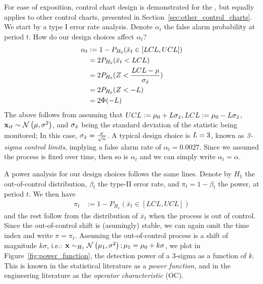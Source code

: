 For ease of exposition, control chart design is demonstrated for the \barxChart, but equally applies to other control charts, presented in Section~\ref{sec:other_control_charts}.
We start by a type I error rate analysis. 
Denote $\alpha_t$ the false alarm probability at period $t$.
How do our design choices affect $\alpha_t$?
\begin{align}
	\alpha_t &:= 1-P_{H_0}(\bar{x}_t \in [LCL,UCL]) \\
	&= 2 P_{H_0}(\bar{x}_t < LCL) \\
	&= 2 P_{H_0}(Z<\frac{LCL-\mu}{\sigma_{\bar{x}}}) \\
	&= 2 P_{H_0}(Z < -L) \\
	&= 2 \Phi(-L)
\end{align}
The above follows from assuming that $UCL:=\mu_0 + L \sigma_{\bar{x}}, LCL:= \mu_0 - L \sigma_{\bar{x}}$, $\mathbf{x}_{it}\sim \mathcal{N}\left(\mu,\sigma^2\right)$, and $\sigma_{\bar{x}}$ being the standard deviation of the statistic being monitored; In this case, $\sigma_{\bar{x}}=\frac{\sigma}{\sqrt{n}}$.
A typical design choice is $L=3$, known as \emph{3-sigma control limits}, implying a false alarm rate of $\alpha_t=0.0027$.
Since we assumed the process is fixed over time, then so is $\alpha_t$ and we can simply write $\alpha_t=\alpha$.

A power analysis for our design choices follows the same lines.
Denote by $H_1$ the out-of-control distribution,  $\beta_t$ the type-II error rate, and $\pi_t=1-\beta_t$ the power, at period $t$.
We then have
\begin{align}
	\pi_t &:= 1-P_{H_1}(\bar{x}_t \in [LCL,UCL])
\end{align}
and the rest follow from the distribution of $\bar{x}_t$ when the process is out of control.
Since the out-of-control shift is (asumingly) stable, we can again omit the time index and write $\pi=\pi_t$.
Assuming the out-of-control process is a shift of magnitude $k \sigma$, i.e.: $\mathbf{x} \sim_{H_1} \mathcal{N}\left(\mu_1,\sigma^2\right); \mu_1=\mu_0+ k \sigma$, we plot in Figure~\ref{fig:power_function}, the detection power of a 3-sigma \barxChart as a function of $k$. 
This is known in the statistical literature as a \emph{power function}, and in the engineering literature as the \emph{operator characteristic} (OC).


